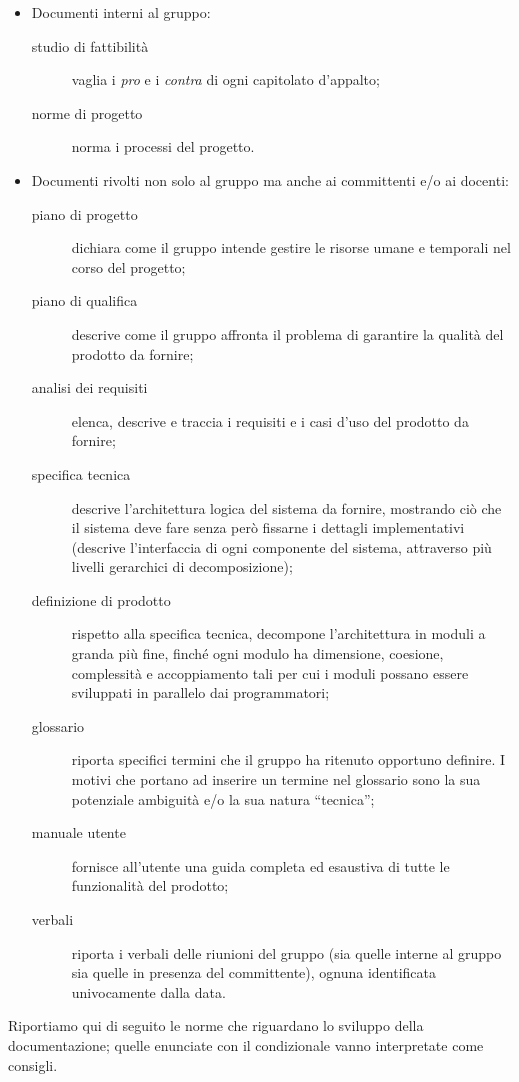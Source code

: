\begin{itemize}
	\item Documenti interni al gruppo:
	\begin{description}
		\item[studio di fattibilità] vaglia i \emph{pro} e i \emph{contra} di ogni capitolato d'appalto;
		\item[norme di progetto] norma i processi del progetto.
	\end{description}
	\item Documenti rivolti non solo al gruppo ma anche ai committenti e/o ai docenti:
	\begin{description}
		\item[piano di progetto] dichiara come il gruppo intende gestire le risorse umane e temporali nel corso del progetto;
		\item[piano di qualifica] descrive come il gruppo affronta il problema di garantire la qualità del prodotto da fornire;
		\item[analisi dei requisiti] elenca, descrive e traccia i requisiti e i casi d'uso del prodotto da fornire;
		\item[specifica tecnica] descrive l'architettura logica del sistema da fornire, mostrando ciò che il sistema deve fare senza però fissarne i dettagli implementativi (descrive l'interfaccia di ogni componente del sistema, attraverso più livelli gerarchici di decomposizione);
		\item[definizione di prodotto] rispetto alla specifica tecnica, decompone l'architettura in moduli a granda più fine, finché ogni modulo ha dimensione, coesione, complessità e accoppiamento tali per cui i moduli possano essere sviluppati in parallelo dai programmatori;
		\item[glossario] riporta specifici termini che il gruppo ha ritenuto opportuno definire. I motivi che portano ad inserire un termine nel glossario sono la sua potenziale ambiguità e/o la sua natura “tecnica”;
		\item[manuale utente] fornisce all'utente una guida completa ed esaustiva di tutte le funzionalità del prodotto;
		\item[verbali] riporta i verbali delle riunioni del gruppo (sia quelle interne al gruppo sia quelle in presenza del committente), ognuna identificata univocamente dalla data.
	\end{description}
\end{itemize}
Riportiamo qui di seguito le norme che riguardano lo sviluppo della documentazione; quelle enunciate con il condizionale vanno interpretate come consigli.

